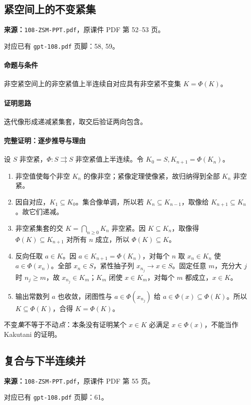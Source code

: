 \clearpage\subsection{紧空间上的不变紧集}
\textbf{来源：}\texttt{108-ZSM-PPT.pdf}，原课件 PDF 第 52--53 页。\par
对应已有 \texttt{gpt-108.pdf} 页脚：58, 59。\par
\paragraph{命题与条件}非空紧空间上的非空紧值上半连续自对应具有非空紧不变集 $K=\Phi(K)$。
\paragraph{证明思路}迭代像形成递减紧集套，取交后验证两向包含。
\paragraph{完整证明：逐步推导与理由}

设 $S$ 非空紧，$\Phi:S\rightrightarrows S$ 非空紧值上半连续。令 $K_0=S,K_{n+1}=\Phi(K_n)$。
\begin{enumerate}
\item 非空值使每个非空 $K_n$ 的像非空；紧像定理使像紧，故归纳得到全部 $K_n$ 非空紧。
\item 因自对应，$K_1\subseteq K_0$。集合像单调，所以若 $K_n\subseteq K_{n-1}$，取像给 $K_{n+1}\subseteq K_n$。故它们递减。
\item 非空紧集套的交 $K=\bigcap_{n\ge0}K_n$ 非空紧。因 $K\subseteq K_n$，取像得 $\Phi(K)\subseteq K_{n+1}$ 对所有 $n$ 成立，所以 $\Phi(K)\subseteq K$。
\item 反向任取 $a\in K$。因 $a\in K_{n+1}=\Phi(K_n)$，对每个 $n$ 取 $x_n\in K_n$ 使 $a\in\Phi(x_n)$。全部 $x_n\in S$，紧性抽子列 $x_{n_j}\to x\in S$。固定任意 $m$，充分大 $j$ 时 $n_j\ge m$，故 $x_{n_j}\in K_m$；$K_m$ 闭使 $x\in K_m$，对每个 $m$ 都成立，$x\in K$。
\item 输出常数列 $a$ 也收敛，闭图性与 $a\in\Phi(x_{n_j})$ 给 $a\in\Phi(x)\subseteq\Phi(K)$。所以 $K\subseteq\Phi(K)$，合得 $K=\Phi(K)$。
\end{enumerate}
不变\emph{集}不等于不动\emph{点}：本条没有证明某个 $x\in K$ 必满足 $x\in\Phi(x)$，不能当作 Kakutani 的证明。

\clearpage\subsection{复合与下半连续并}
\textbf{来源：}\texttt{108-ZSM-PPT.pdf}，原课件 PDF 第 55 页。\par
对应已有 \texttt{gpt-108.pdf} 页脚：61。\par
